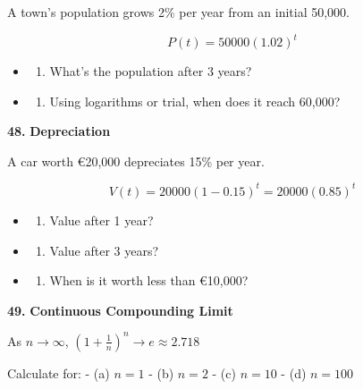 \documentclass[
  11pt,
]{article}
\providecommand{\tightlist}{%
  \setlength{\itemsep}{0pt}\setlength{\parskip}{0pt}}
\begin{document}
A town's population grows 2\% per year from an initial 50,000.

\[P(t) = 50000(1.02)^t\]

\begin{itemize}
\item
  \begin{enumerate}
  \def\labelenumi{(\alph{enumi})}
  \tightlist
  \item
    What's the population after 3 years?
  \end{enumerate}
\item
  \begin{enumerate}
  \def\labelenumi{(\alph{enumi})}
  \setcounter{enumi}{1}
  \tightlist
  \item
    Using logarithms or trial, when does it reach 60,000?
  \end{enumerate}
\end{itemize}

\textbf{48.} \textbf{Depreciation}

A car worth €20,000 depreciates 15\% per year.

\[V(t) = 20000(1 - 0.15)^t = 20000(0.85)^t\]

\begin{itemize}
\item
  \begin{enumerate}
  \def\labelenumi{(\alph{enumi})}
  \tightlist
  \item
    Value after 1 year?
  \end{enumerate}
\item
  \begin{enumerate}
  \def\labelenumi{(\alph{enumi})}
  \setcounter{enumi}{1}
  \tightlist
  \item
    Value after 3 years?
  \end{enumerate}
\item
  \begin{enumerate}
  \def\labelenumi{(\alph{enumi})}
  \setcounter{enumi}{2}
  \tightlist
  \item
    When is it worth less than €10,000?
  \end{enumerate}
\end{itemize}

\textbf{49.} \textbf{Continuous Compounding Limit}

As \(n \to \infty\),
\(\left(1 + \frac{1}{n}\right)^n \to e \approx 2.718\)

Calculate for: - (a) \(n = 1\) - (b) \(n = 2\) - (c) \(n = 10\) - (d)
\(n = 100\)
\end{document}
